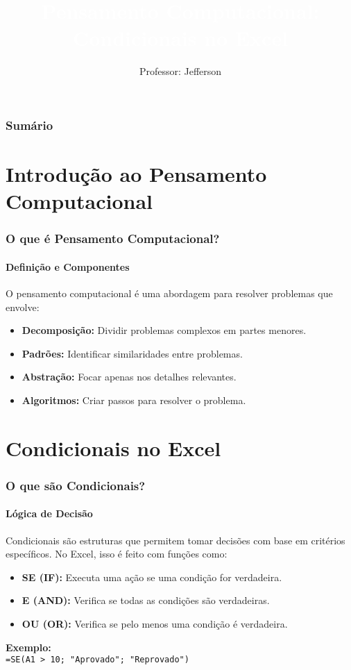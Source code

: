 \documentclass[12pt]{beamer}
\title{\textcolor{white}{Pensamento Computacional: Condicionais no Excel}}
\author{Professor: Jefferson}
\date{}
\begin{document}
\frame{\titlepage}

\begin{frame}
    \frametitle{Sumário}
    \tableofcontents
\end{frame}

\section{Introdução ao Pensamento Computacional}

\begin{frame}
    \frametitle{O que é Pensamento Computacional?}
    \framesubtitle{Definição e Componentes}
    O pensamento computacional é uma abordagem para resolver problemas que envolve:
    \begin{itemize}
        \item \textbf{Decomposição:} Dividir problemas complexos em partes menores.
        \item \textbf{Padrões:} Identificar similaridades entre problemas.
        \item \textbf{Abstração:} Focar apenas nos detalhes relevantes.
        \item \textbf{Algoritmos:} Criar passos para resolver o problema.
    \end{itemize}
\end{frame}

\section{Condicionais no Excel}

\begin{frame}
    \frametitle{O que são Condicionais?}
    \framesubtitle{Lógica de Decisão}
    Condicionais são estruturas que permitem tomar decisões com base em critérios específicos. No Excel, isso é feito com funções como:
    \begin{itemize}
        \item \textbf{SE (IF):} Executa uma ação se uma condição for verdadeira.
        \item \textbf{E (AND):} Verifica se todas as condições são verdadeiras.
        \item \textbf{OU (OR):} Verifica se pelo menos uma condição é verdadeira.
    \end{itemize}
    \textbf{Exemplo:\\} \texttt{=SE(A1 > 10; "Aprovado"; "Reprovado")}
\end{frame}
\end{document}
